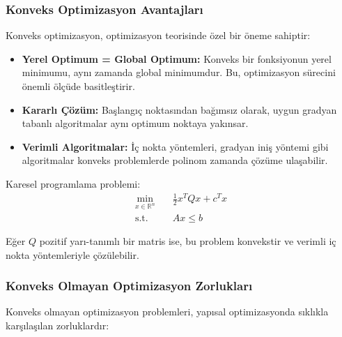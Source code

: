 \subsubsection{Konveks Optimizasyon Avantajları}
Konveks optimizasyon, optimizasyon teorisinde özel bir öneme sahiptir:

\begin{itemize}
    \item \textbf{Yerel Optimum = Global Optimum:} Konveks bir fonksiyonun yerel minimumu, aynı zamanda global minimumdur. Bu, optimizasyon sürecini önemli ölçüde basitleştirir.
    \item \textbf{Kararlı Çözüm:} Başlangıç noktasından bağımsız olarak, uygun gradyan tabanlı algoritmalar aynı optimum noktaya yakınsar.
    \item \textbf{Verimli Algoritmalar:} İç nokta yöntemleri, gradyan iniş yöntemi gibi algoritmalar konveks problemlerde polinom zamanda çözüme ulaşabilir.
\end{itemize}

\begin{tcolorbox}[title=Konveks Optimizasyon Örneği]
Karesel programlama problemi:
\begin{equation}
\begin{aligned}
\min_{x \in \mathbb{R}^n} & \quad \frac{1}{2}x^TQx + c^Tx \\
\text{s.t.} & \quad Ax \leq b
\end{aligned}
\end{equation}

Eğer $Q$ pozitif yarı-tanımlı bir matris ise, bu problem konvekstir ve verimli iç nokta yöntemleriyle çözülebilir.
\end{tcolorbox}

\subsubsection{Konveks Olmayan Optimizasyon Zorlukları}
Konveks olmayan optimizasyon problemleri, yapısal optimizasyonda sıklıkla karşılaşılan zorluklardır:

